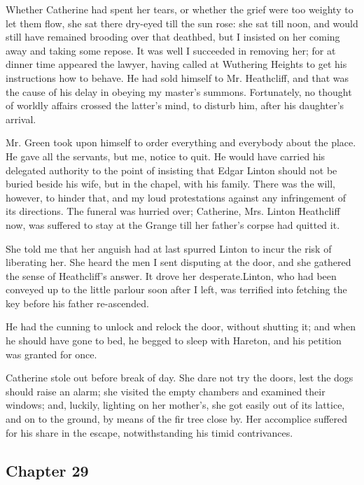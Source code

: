 \par Whether Catherine had spent her tears, or whether the grief were too weighty to let them flow, she sat there dry-eyed till the sun rose: she sat till noon, and would still have remained brooding over that deathbed, but I insisted on her coming away and taking some repose. It was well I succeeded in removing her; for at dinner time appeared the lawyer, having called at Wuthering Heights to get his instructions how to behave. He had sold himself to Mr. Heathcliff, and that was the cause of his delay in obeying my master's summons. Fortunately, no thought of worldly affairs crossed the latter's mind, to disturb him, after his daughter's arrival.
\par Mr. Green took upon himself to order everything and everybody about the place. He gave all the servants, but me, notice to quit. He would have carried his delegated authority to the point of insisting that Edgar Linton should not be buried beside his wife, but in the chapel, with his family. There was the will, however, to hinder that, and my loud protestations against any infringement of its directions. The funeral was hurried over; Catherine, Mrs. Linton Heathcliff now, was suffered to stay at the Grange till her father's corpse had quitted it.
\par She told me that her anguish had at last spurred Linton to incur the risk of liberating her. She heard the men I sent disputing at the door, and she gathered the sense of Heathcliff's answer. It drove her desperate.Linton, who had been conveyed up to the little parlour soon after I left, was terrified into fetching the key before his father re-ascended.
\par He had the cunning to unlock and relock the door, without shutting it; and when he should have gone to bed, he begged to sleep with Hareton, and his petition was granted for once.
\par Catherine stole out before break of day. She dare not try the doors, lest the dogs should raise an alarm; she visited the empty chambers and examined their windows; and, luckily, lighting on her mother's, she got easily out of its lattice, and on to the ground, by means of the fir tree close by. Her accomplice suffered for his share in the escape, notwithstanding his timid contrivances.


\subsection*{Chapter 29}

